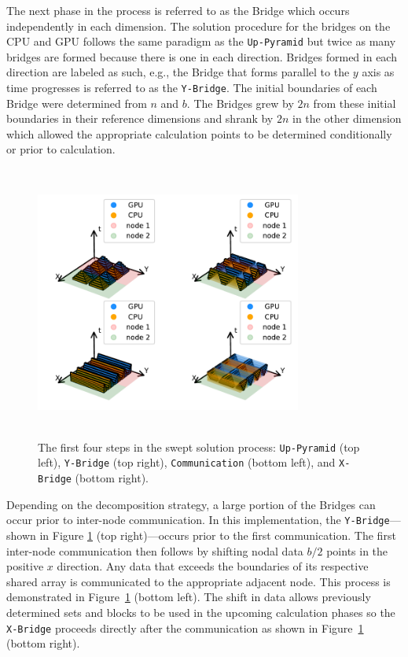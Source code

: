 \documentclass[preprints,article,accept,moreauthors,pdftex]{Definitions/mdpi}
\def\Up{\texttt{Up-Pyramid}}
\def\Xb{\texttt{X-Bridge}}
\def\Yb{\texttt{Y-Bridge}}
\begin{document}
The next phase in the process is referred to as the Bridge which occurs independently in each dimension. The solution procedure for the bridges on the CPU and GPU follows the same paradigm as the \Up{} but twice as many bridges are formed because there is one in each direction. Bridges formed in each direction are labeled as such, e.g., the Bridge that forms parallel to the $y$ axis as time progresses is referred to as the \Yb{}. The initial boundaries of each Bridge were determined from $n$ and $b$. The Bridges grew by $2n$ from these initial boundaries in their reference dimensions and shrank by $2n$ in the other dimension which allowed the appropriate calculation points to be determined conditionally or prior to calculation.

\begin{figure}[htbp]
    \centering
    \includegraphics[height=9cm,width=0.78\textwidth, trim={1cm 0.6cm 0.25cm 0.2cm},clip]{figs/SubsPlot1.pdf}
    \caption{The first four steps in the swept solution process: \Up{} (top left), \Yb{} (top right), \texttt{Communication} (bottom left), and \Xb{} (bottom right).}
    \label{fig:MainOne}
\end{figure}

Depending on the decomposition strategy, a large portion of the Bridges can occur prior to inter-node communication. In this implementation, the \Yb{}---shown in Figure \ref{fig:MainOne} (top right)---occurs prior to the first communication. The first inter-node communication then follows by shifting nodal data $b/2$ points in the positive $x$ direction. Any data that exceeds the boundaries of its respective shared array is communicated to the appropriate adjacent node. This process is demonstrated in Figure~\ref{fig:MainOne} (bottom left). The shift in data allows previously determined sets and blocks to be used in the upcoming calculation phases so the \Xb{} proceeds directly after the communication as shown in Figure~\ref{fig:MainOne} (bottom right).
\end{document}
